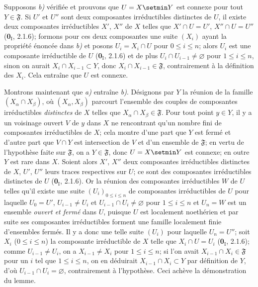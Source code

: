 Supposons \emph{b)} vérifiée et prouvons que $U=X\setmin Y$ est connexe pour tout
$Y\in\mathfrak F$. Si $U'$ et $U''$ sont deux composantes irréductibles
distinctes de $U$, il existe deux composantes irréductibles $X'$, $X''$ de
$X$ telles que $X'\cap U=U'$, $X''\cap U=U''$ (\textbf{0}$_\mathrm I$, 2.1.6);
formons pour ces deux composantes une suite $(X_i)$ ayant la propriété énoncée
dans \emph{b)} et posons $U_i=X_i\cap U$ pour $0\leq i\leq n$; alors $U_i$ est une
composante irréductible de $U$ (\textbf{0}$_\mathrm I$, 2.1.6) et de plus
$U_i\cap U_{i-1}\neq\varnothing$ pour $1\leq i\leq n$, sinon on aurait
$X_i\cap X_{i-1}\subset Y$, donc $X_i\cap X_{i-1}\in\mathfrak F$,
contrairement à la définition des $X_i$. Cela entraîne que $U$ est connexe.

Montrons maintenant que \emph{a)} entraîne \emph{b)}. Désignons par $Y$ la réunion de la
famille $(X_\alpha\cap X_\beta)$, où $(X_\alpha,X_\beta)$ parcourt l'ensemble
des couples de composantes irréductibles \emph{distinctes} de $X$ telles que
$X_\alpha\cap X_\beta\in\mathfrak F$. Pour tout point $y\in Y$, il y a un
voisinage ouvert $V$ de $y$ dans $X$ ne rencontrant qu'un nombre fini de
composantes irréductibles de $X$; cela montre d'une part que $Y$ est fermé et
d'autre part que $V\cap Y$ est intersection de $V$ et d'un ensemble de
$\mathfrak F$; en vertu de l'hypothèse faite sur $\mathfrak F$, on a
$Y\in\mathfrak F$, donc $U=X\setmin Y$ est connexe; en outre $Y$ est rare dans $X$.
Soient alors $X'$, $X''$ deux composantes irréductibles distinctes de $X$,
$U'$, $U''$ leurs traces respectives sur $U$; ce sont des composantes
irréductibles distinctes de $U$ (\textbf{0}$_\mathrm I$, 2.1.6). Or la réunion des
composantes irréductibles $W$ de $U$ telles qu'il existe une suite
$(U_i)_{0\leq i\leq n}$ de composantes irréductibles de $U$ pour laquelle
$U_0=U'$, $U_{i-1}\neq U_i$ et $U_{i-1}\cap U_i\neq\varnothing$ pour
$1\leq i\leq n$ et $U_n=W$ est un ensemble \emph{ouvert et fermé} dans $U$, puisque
$U$ est localement noethérien et par suite ses composantes irréductibles
forment une famille localement finie d'ensembles fermés. Il y a donc une telle
suite $(U_i)$ pour laquelle $U_n=U''$; soit $X_i$ ($0\leq i\leq n$) la
composante irréductible de $X$ telle que $X_i\cap U=U_i$
(\textbf{0}$_\mathrm I$, 2.1.6); comme $U_{i-1}\neq U_i$, on a
$X_{i-1}\neq X_i$ pour $1\leq i\leq n$; si l'on avait
$X_{i-1}\cap X_i\in\mathfrak F$ pour un $i$ tel que $1\leq i\leq n$, on en
déduirait $X_{i-1}\cap X_i\subset Y$ par définition de $Y$, d'où
$U_{i-1}\cap U_i=\varnothing$, contrairement à l'hypothèse. Ceci achève la
démonstration du lemme.

